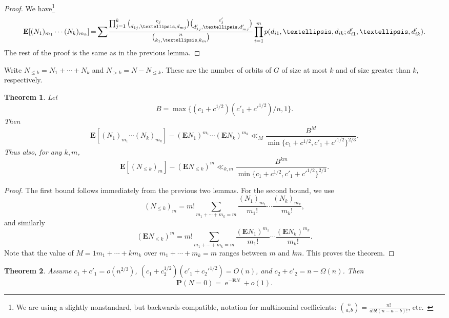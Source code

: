 \documentclass[10pt,a4paper]{amsart}
\newtheorem{theorem}{Theorem}[section]
\theoremstyle{remark}
\providecommand{\etc}{etc.\ }
\DeclareMathOperator{\expe}{e}
\renewcommand\P{\mathbf{P}}
\newcommand\E{\mathbf{E}}
\newcommand*{\mk}{\mkern -1mu}
\newcommand*{\Mk}{\mkern -2mu}
\begin{document}
\begin{proof}
We have\footnote{We are using a slightly nonstandard, but backwards-compatible, notation for multinomial coefficients: $\binom{n}{a, b} = \frac{n!}{a!b!(n-a-b)!}$, \etc}
\begin{equation*}
 \E[(N_1)_{m_1} \cdots (N_k)_{m_k}] %
 \Mk = \Mk \sum \Mk \frac{\prod_{j=1}^{k} \binom{c_j}{d_{1j}, \dots, d_{mj}} \binom{c'_j}{d'_{1j}, \dots, d'_{mj}}}
 {\binom{n}{k_1, \dots, k_m}}
 \mk \prod_{i=1}^m \mk p(d_{i1}, \dots, d_{ik} ; d'_{i1}, \dots, d'_{ik}).
\end{equation*}
The rest of the proof is the same as in the previous lemma.
\end{proof}

Write $N_{\leq k} = N_1 + \cdots + N_k$ and $N_{>k} = N - N_{\leq k}$.
These are the number of orbits of $G$ of size at most $k$ and of size greater than $k$, respectively.

\begin{theorem} \label{thm:poisson-approximation}
Let
\[
 B = \max \{(c_1 + c^{1/2}) (c'_1 + {c'}^{1/2}) / n, 1\}.
\]
Then
\[
 \E[(N_1)_{m_1} \cdots (N_k)_{m_k}] - (\E N_1)^{m_1} \cdots (\E N_k)^{m_k}
 \ll_M
 \frac{B^M}{\min\{c_1 + c^{1/2}, c'_1 + {c'}^{1/2}\}^{2/3}}.
\]
Thus also, for any $k,m$,
\[
\E[(N_{\leq k})_m] - (\E N_{\leq k})^m 
 \ll_{k,m}
 \frac{B^{km}}{\min\{c_1 + c^{1/2}, c'_1 + {c'}^{1/2}\}^{2/3}}
 .
\]
\end{theorem}

\begin{proof}
The first bound follows immediately from the previous two lemmas. For the second bound, we use
\[
 (N_{\leq k})_m = m! \sum_{m_1 + \cdots + m_k = m} \frac{(N_1)_{m_1}}{m_1!} \cdots \frac{(N_k)_{m_k}}{m_k!},
\]
and similarly
\[
 (\E N_{\leq k})^m = m! \sum_{m_1 + \cdots + m_k = m} \frac{(\E N_1)^{m_1}}{m_1!} \cdots \frac{(\E N_k)^{m_k}}{m_k!}.
\]
Note that the value of
$
 M = 1 m_1 + \cdots + k m_k
$
over
$
 m_1 + \cdots + m_k = m
$
ranges between $m$ and $km$. This proves the theorem.
\end{proof}


\begin{theorem}
Assume $c_1 + c'_1 = o(n^{2/3})$, $(c_1 + c_2^{1/2}) (c'_1 + {c_2'}^{1/2}) = O(n)$, and $c_2 + c'_2 = n - \Omega(n)$. Then 
\[
 \P(N = 0) = \expe^{-\E N} + o(1).
\]
\end{theorem}
\end{document}
